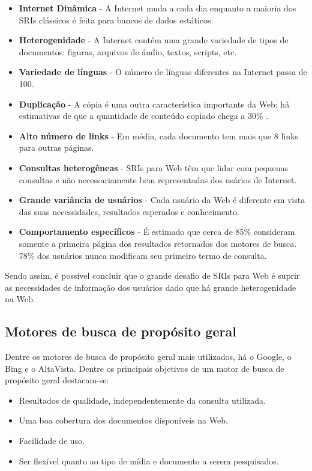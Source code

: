 \begin{itemize}
	\item \textbf{Internet Dinâmica} - A Internet muda a cada dia enquanto a maioria dos SRIs clássicos é feita para bancos de dados estáticos.
	\item \textbf{Heterogenidade} - A Internet contém uma grande variedade de tipos de documentos: figuras, arquivos de áudio, textos, scripts, etc.
	\item \textbf{Variedade de línguas} - O número de línguas diferentes na Internet passa de 100.
	\item \textbf{Duplicação} - A cópia é uma outra característica importante da Web: há estimativas de que a quantidade de conteúdo copiado chega a 30\% \cite{surveyir}.
	\item \textbf{Alto número de links} - Em média, cada documento tem mais que 8 links para outras páginas.
	\item \textbf{Consultas heterogêneas} - SRIs para Web têm que lidar com pequenas consultas e não necessariamente bem representadas dos usários de Internet.
	\item \textbf{Grande variância de usuários} - Cada usuário da Web é diferente em vista das suas necessidades, resultados esperados e conhecimento.
	\item \textbf{Comportamento específicos} - É estimado que cerca de 85\% consideram somente a primeira página dos resultados retornados dos motores de busca. 78\% dos usuários nunca modificam seu primeiro termo de consulta.
\end{itemize}

Sendo assim, é possível concluir que o grande desafio de SRIs para Web é suprir as necessidades de informação dos usuários dado que há grande heterogenidade na Web.

\subsection{Motores de busca de propósito geral}

Dentre os motores de busca de propósito geral mais utilizados, há o Google, o Bing e o AltaVista. Dentre os principais objetivos de um motor de busca de propósito geral destacam-se: 

\begin{itemize}
	\item Resultados de qualidade, independentemente da consulta utilizada.
	\item Uma boa cobertura dos documentos disponíveis na Web.
	\item Facilidade de uso.
	\item Ser flexível quanto ao tipo de mídia e documento a serem pesquisados.
\end{itemize}

